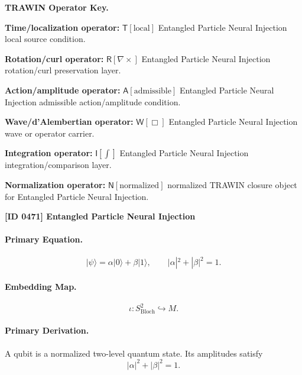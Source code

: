 \par\vspace{0.45\baselineskip}
\noindent\begin{minipage}[t]{\linewidth}
\begingroup
\small
\raggedright
\textbf{TRAWIN Operator Key.}\par
\noindent\textbf{Time/localization operator:} $\mathsf{T}\!\left[\mathrm{local}\right]$ Entangled Particle Neural Injection local source condition.\par
\noindent\textbf{Rotation/curl operator:} $\mathsf{R}\!\left[\nabla\times\right]$ Entangled Particle Neural Injection rotation/curl preservation layer.\par
\noindent\textbf{Action/amplitude operator:} $\mathsf{A}\!\left[\mathrm{admissible}\right]$ Entangled Particle Neural Injection admissible action/amplitude condition.\par
\noindent\textbf{Wave/d'Alembertian operator:} $\mathsf{W}\!\left[\Box\right]$ Entangled Particle Neural Injection wave or operator carrier.\par
\noindent\textbf{Integration operator:} $\mathsf{I}\!\left[\int\right]$ Entangled Particle Neural Injection integration/comparison layer.\par
\noindent\textbf{Normalization operator:} $\mathsf{N}\!\left[\mathrm{normalized}\right]$ normalized TRAWIN closure object for Entangled Particle Neural Injection.\par
\endgroup
\end{minipage}

\clearpage
\noindent\textbf{[ID 0471] Entangled Particle Neural Injection}\par
\vspace{0.35em}
\paragraph{Primary Equation.}
\begin{equation}
|\psi\rangle = \alpha|0\rangle+\beta|1\rangle,
\qquad
|\alpha|^2+|\beta|^2=1 .
\end{equation}

\paragraph{Embedding Map.}
\begin{equation}
\iota:S^2_{\mathrm{Bloch}}\hookrightarrow M .
\end{equation}

\paragraph{Primary Derivation.}
A qubit is a normalized two-level quantum state. Its amplitudes satisfy
\begin{equation}
|\alpha|^2+|\beta|^2=1 .
\end{equation}


